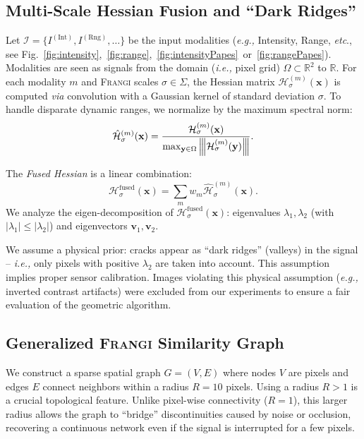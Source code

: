\documentclass[conference]{IEEEtran}
\newcommand{\eg}[0]{\textit{e.g., }}
\newcommand{\ie}[0]{\textit{i.e., }}
\newcommand{\Frangi}[0]{\textsc{Frangi}}
\newcommand{\Hess}[0]{\mathcal{H}}
\newcommand{\matnorm}[1]{%
  \left\lvert\mkern-2mu\left\lvert\mkern-2mu\left\lvert #1 \right\rvert\mkern-2mu\right\rvert\mkern-2mu\right\rvert
}%
\begin{document}
\subsection{Multi-Scale Hessian Fusion and ``Dark Ridges''}
Let $\mathcal{I} = \{I^{(\text{Int})}, I^{(\text{Rng})}, \ldots\}$ be the input modalities (\eg Intensity, Range, \textit{etc}., see Fig.~\ref{fig:intensity},~\ref{fig:range},~\ref{fig:intensityPapes}~or~\ref{fig:rangePapes}). 
Modalities are seen as signals from the domain (\ie pixel grid) $\Omega \subset\mathbb R^2$ to $\mathbb R$.
For each modality $m$ and \Frangi{} scales $\sigma \in \Sigma$, the Hessian matrix $\Hess_{\sigma}^{(m)}(\mathbf{x})$ is computed \emph{via} convolution with a Gaussian kernel of standard deviation $\sigma$. To handle disparate dynamic ranges, we normalize by the maximum spectral norm:
\begin{equation}
    \hat{\Hess}_{\sigma}^{(m)}(\mathbf{x}) = \frac{\Hess_{\sigma}^{(m)}(\mathbf{x})}{\max_{\mathbf{y} \in \Omega} \matnorm{\Hess_{\sigma}^{(m)}(\mathbf{y})} }.
\end{equation}

The \textit{Fused Hessian} is a %
linear combination:
\begin{equation}
    \Hess_{\sigma}^{\text{fused}}(\mathbf{x}) = \sum_{m} w_m \hat{\Hess}_{\sigma}^{(m)}(\mathbf{x}).
\end{equation}
We analyze the eigen-decomposition of $\Hess_{\sigma}^{\text{fused}}(\mathbf x)$: eigenvalues $\lambda_1, \lambda_2$ (with $|\lambda_1| \le |\lambda_2|$) and eigenvectors $\mathbf{v}_1, \mathbf{v}_2$.


We assume a physical prior: cracks appear as ``dark ridges'' (valleys) in the signal -- \ie only pixels with positive $\lambda_2 $ are taken into account. 
This assumption implies proper sensor calibration. 
Images violating this physical assumption (\eg inverted contrast artifacts) were excluded from our experiments to ensure a fair evaluation of the geometric algorithm. %

\subsection{Generalized \Frangi{} Similarity Graph}
We construct a sparse spatial graph $G=(V, E)$ where nodes $V$ are pixels and edges $E$ connect neighbors within a radius $R=10$ pixels.
Using a radius $R>1$ is a crucial topological feature. Unlike pixel-wise connectivity ($R=1$), this larger radius allows the graph to ``bridge'' discontinuities caused by noise or occlusion, recovering a continuous network even if the signal is interrupted for a few pixels.
\end{document}
